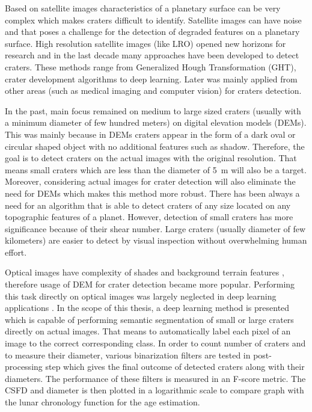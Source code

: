 \documentclass[11pt]{article}
\begin{document}
Based on satellite images characteristics of a planetary surface can be very complex which makes craters difficult to identify. Satellite images can have noise and that poses a challenge for the detection of degraded features on a planetary surface. High resolution satellite images (like LRO) opened new horizons for research and in the last decade many approaches have been developed to detect craters. These methods range from Generalized Hough Transformation (GHT), crater development algorithms to deep learning. Later was mainly applied from other areas (such as medical imaging and computer vision) for craters detection. 

In the past, main focus remained on medium to large sized craters (usually with a minimum diameter of few hundred meters) on digital elevation models (DEMs). This was mainly because in DEMs craters appear in the form of a dark oval or circular shaped object with no additional features such as shadow. Therefore, the goal is to detect craters on the actual images with the original resolution. That means small craters which are less than the diameter of \SI{5}{\metre} will also be a target. Moreover, considering actual images for crater detection will also eliminate the need for DEMs which makes this method more robust. There has been always a need for an algorithm that is able to detect craters of any size located on any topographic features of a planet. However, detection of small craters has more significance because of their shear number. Large craters (usually diameter of few kilometers) are easier to detect by visual inspection without overwhelming human effort.

Optical images have complexity of shades and background terrain features \cite{ali2019automated}, therefore usage of DEM for crater detection became more popular. Performing this task directly on optical images was largely neglected in deep learning applications \cite{finkelsteinautomatic}. In the scope of this thesis, a deep learning method is presented which is capable of performing semantic segmentation of small or large craters directly on actual images. That means to automatically label each pixel of an image to the correct corresponding class. In order to count number of craters and to measure their diameter, various binarization filters are tested in post-processing step which gives the final outcome of detected craters along with their diameters.  The performance of these filters is measured in an F-score metric. The CSFD and diameter is then plotted in a logarithmic scale to compare graph with the lunar chronology function for the age estimation. 
\end{document}
